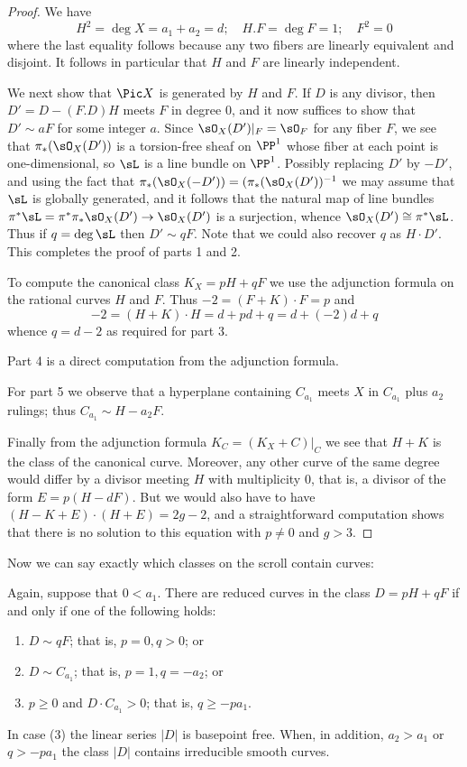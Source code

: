 \begin{proof}
We have 
$$
H^2 = \deg X = a_1+a_2 = d; \quad H.F = \deg F = 1; \quad F^2 = 0
$$
where the last equality follows because any two fibers are linearly equivalent and disjoint.
It follows in particular that $H$ and $F$ are linearly independent.

We next show that $\Pic X$ is generated by $H$ and $F$. If $D$ is any divisor,
then $D' = D - (F.D)H$ meets $F$ in degree 0, and it now suffices to show that $D'\sim aF$ for
some integer $a$.
Since $\sO_X(D')|_F = \sO_F$ for any fiber $F$, we see that
$\pi_*(\sO_X(D'))$ is a torsion-free sheaf on $\PP^1$ whose fiber at each point is one-dimensional, 
so $\sL$ is a line bundle on $\PP^1$.  Possibly replacing $D'$ by $-D'$, and using the fact that
$\pi_*(\sO_X(-D')) = (\pi_*(\sO_X(D'))^{-1}$ we may assume that $\sL$ is globally generated, and it follows that  the natural map of line bundles $\pi^*\sL = \pi^*\pi_* \sO_X(D') \to \sO_X(D') $ is a surjection, whence 
$\sO_X(D') \cong \pi^*\sL$. Thus if $q = \deg \sL$ then
$D' \sim qF$. Note that we could also recover $q$ as $H\cdot D'$. This completes the proof of parts
1 and 2.

To compute the canonical class $K_X = pH+qF$ we use the adjunction formula on the rational curves
$H$ and $F$. Thus $-2 = (F+K)\cdot F = p $ and 
$$
-2 = (H+K)\cdot H = d + pd+q = d + (-2)d+q
$$
whence $q = d-2$ as required for part 3.
 
 Part 4 is a direct computation from the adjunction formula.
 
For part 5 we observe that a hyperplane containing $C_{a_1}$ meets $X$ in $C_{a_1}$ plus
$a_2$ rulings; thus $C_{a_1}\sim H-a_2F$.

Finally from the adjunction formula $K_C = (K_X+C)|_C$ we see that $H+K$ is the class of
the canonical curve. Moreover, any other curve of the same degree would differ by
a divisor meeting $H$ with multiplicity 0, that is, a divisor of the form $E = p(H-dF)$.
But we would also have to have $(H-K+E)\cdot(H+E) = 2g-2$, and a straightforward
computation shows that there is no solution to this equation with $p\neq 0$ and $g>3$.
\end{proof}

Now we can say exactly which classes on the scroll contain curves:

\begin{theorem}\label{where are the curves?} Again, suppose that $0<a_{1}$.
There are reduced  curves in the class $D = pH+qF$ if and only if one of the following holds:

\begin{enumerate}
\item $D\sim qF$; that is, $p=0, q>0$; or
\item $D\sim C_{a_{1}}$; that is, $p=1, q=-a_{2}$; or
\item $p\geq 0$ and $D\cdot C_{a_{1}}> 0$; that is, $q \geq -pa_1.$
\end{enumerate}
In case (3) the linear series $|D|$ is basepoint free. When, in addition, $a_2>a_1$ or $q>-pa_1$ the class $|D|$ contains irreducible smooth curves.
\end{theorem}


